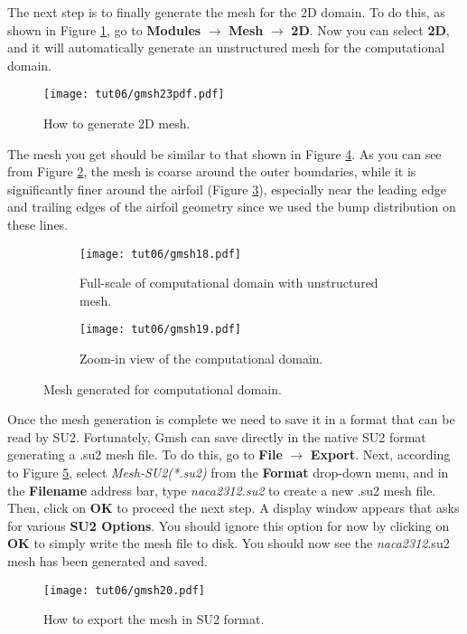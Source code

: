 The next step is to finally generate the mesh for the 2D domain. To do this, as shown in Figure \ref{fig6:gmsh23}, go to \textbf{Modules} $\rightarrow$ \textbf{Mesh} $\rightarrow$ \textbf{2D}. Now you can select \textbf{2D}, and it will  automatically generate an unstructured mesh for the computational domain.
\begin{figure}[htbp]
    \centering
    \texttt{[image: tut06/gmsh23pdf.pdf]}
    \caption{How to generate 2D mesh.}
    \label{fig6:gmsh23}
\end{figure}
The mesh you get should be similar to that shown in Figure \ref{fig6:gmsh18}. As you can see from Figure \ref{fig6:gmsh18 a}, the mesh is coarse around the outer boundaries, while it is significantly finer around the airfoil (Figure \ref{fig6:gmsh18 b}), especially near the leading edge and trailing edges of the airfoil geometry since we used the bump distribution on these lines.
\begin{figure}[htbp]
    \centering
     \begin{subfigure}[b]{.75\textwidth}
         \centering
         \texttt{[image: tut06/gmsh18.pdf]}
         \caption{Full-scale of computational domain with unstructured mesh.}
         \label{fig6:gmsh18 a}
     \end{subfigure}
     \hfill
     \begin{subfigure}[b]{.75\textwidth}
         \centering
         \texttt{[image: tut06/gmsh19.pdf]}
         \caption{Zoom-in view of the computational domain.}
         \label{fig6:gmsh18 b}
     \end{subfigure}  
    \caption{Mesh generated for computational domain.}
    \label{fig6:gmsh18}
\end{figure}
Once the mesh generation is complete we need to save it in a format that can be read by SU2. Fortunately, Gmsh can save directly in the native SU2 format generating a .su2 mesh file. To do this, go to \textbf{File} $\rightarrow$ \textbf{Export}. Next, according to Figure \ref{fig6:gmsh20}, select \textit{Mesh-SU2(*.su2)} from the \textbf{Format} drop-down menu, and in the \textbf{Filename} address bar, type \textit{naca2312.su2} to create a new .su2 mesh file. Then, click on \textbf{OK} to proceed the next step. A display window appears that asks for various \textbf{SU2 Options}. You should ignore this option for now by clicking on \textbf{OK} to simply write the mesh file to disk. You should now see the \textit{naca2312}.su2 mesh has been generated and saved.
\begin{figure}[htbp]
    \centering
    \texttt{[image: tut06/gmsh20.pdf]}
    \caption{How to export the mesh in SU2 format.}
    \label{fig6:gmsh20}
\end{figure}
